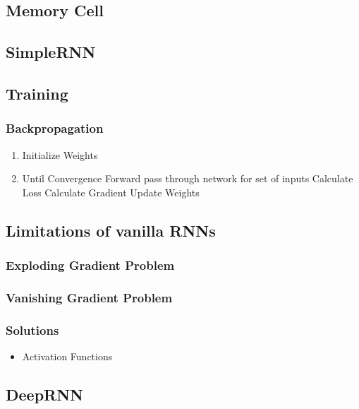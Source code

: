 \documentclass[a4paper, landscape, 10pt]{scrartcl}
\begin{document}
\begin{multicols*}{3}
        \subsection{Memory Cell}

        \subsection{SimpleRNN}
        

        \subsection{Training}
        \subsubsection{Backpropagation}
        \begin{enumerate}
            \item Initialize Weights
            \item Until Convergence
            \subitem Forward pass through network for set of inputs
            \subitem Calculate Loss
            \subitem Calculate Gradient
            \subitem Update Weights
        \end{enumerate}
        
        \subsection{Limitations of vanilla RNNs}
        \subsubsection{Exploding Gradient Problem}


        \subsubsection{Vanishing Gradient Problem}

        \subsubsection{Solutions}
        \begin{itemize}
            \item Activation Functions
        \end{itemize}

        \subsection{DeepRNN}


\end{multicols*}
\end{document}
